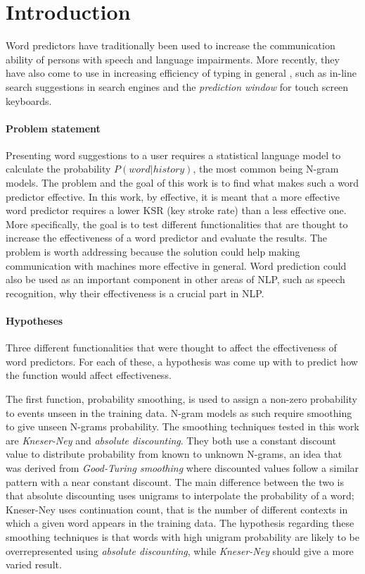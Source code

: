 \section{Introduction}
Word predictors have traditionally been used to increase the communication ability of persons with speech and language impairments\cite{Lesher99effectsof}\cite{keystrokes}\cite{corpus}. More recently, they have also come to use in increasing efficiency of typing in general \cite{Lesher99effectsof}, such as in-line search suggestions in search engines and the \emph{prediction window} for touch screen keyboards. 

\paragraph{Problem statement}
Presenting word suggestions to a user requires a statistical language model\cite{keystrokes} to calculate the probability $P(word|history)$, the most common being N-gram models\cite{Wandmacher}. The problem and the goal of this work is to find what makes such a word predictor effective. In this work, by effective, it is meant that a more effective word predictor requires a lower KSR (key stroke rate) than a less effective one. More specifically, the goal is to test different functionalities that are thought to increase the effectiveness of a word predictor and evaluate the results. The problem is worth addressing because the solution could help making communication with machines more effective in general. Word prediction could also be used as an important component in other areas of NLP, such as speech recognition, why their effectiveness is a crucial part in NLP.

\paragraph{Hypotheses}
Three different functionalities that were thought to affect the effectiveness of word predictors. For each of these, a hypothesis was come up with to predict how the function would affect effectiveness.

The first function, probability smoothing, is used to assign a non-zero probability to events unseen in the training data\cite{smoothing}. N-gram models as such require smoothing to give unseen N-grams probability\cite{Russel}. The smoothing techniques tested in this work are \emph{Kneser-Ney} and \emph{absolute discounting}. They both use a constant discount value to distribute probability from known to unknown N-grams, an idea that was derived from \emph{Good-Turing smoothing} where discounted values follow a similar pattern with a near constant discount\cite{coursera}. The main difference between the two is that absolute discounting uses unigrams to interpolate the probability of a word; Kneser-Ney uses continuation count, that is the number of different contexts in which a given word appears in the training data\cite{coursera}. The hypothesis regarding these smoothing techniques is that words with high unigram probability are likely to be overrepresented using \emph{absolute discounting}, while \emph{Kneser-Ney} should give a more varied result.

